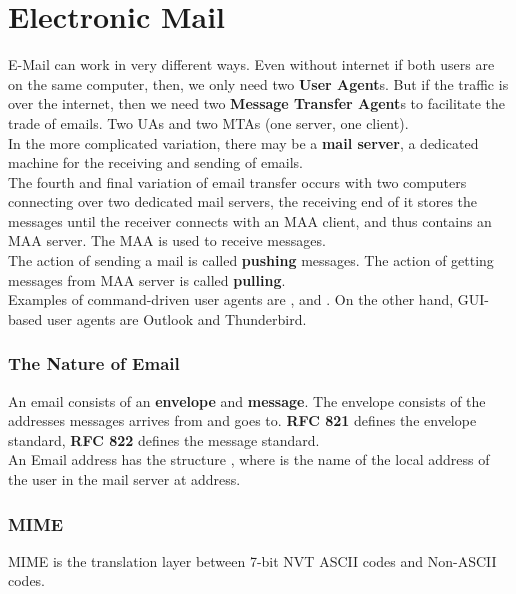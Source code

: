 \documentclass[11pt,a4paper,twoside]{book}
\begin{document}
\section{Electronic Mail}

E-Mail can work in  very different ways. Even without internet if both users are on the same computer, then, we only need two \textbf{User Agent}s. But if the traffic is over the internet, then we need two \textbf{Message Transfer Agent}s to facilitate  the trade of emails. Two UAs and two MTAs (one server, one client).\\

In the more complicated variation, there may be a \textbf{mail server}, a dedicated machine for the receiving and sending of emails.\\

The fourth and final variation of email transfer occurs with two computers connecting over two dedicated mail servers, the receiving end of it stores the messages until the receiver connects with an MAA client, and thus contains an MAA server. The MAA is used to receive messages.\\

The action of sending a mail is called \textbf{pushing} messages. The action of getting messages from MAA server is called \textbf{pulling}.\\

Examples of command-driven user agents are ,  and . On the other hand, GUI-based user agents are Outlook and Thunderbird.

\subsubsection{The Nature of Email}

An email consists of an \textbf{envelope} and \textbf{message}. The envelope consists of the addresses messages arrives from and goes to. \textbf{RFC 821} defines the envelope standard, \textbf{RFC 822} defines the message standard.\\

An Email address has the structure , where  is the name of the local address of the user in the mail server at  address.

\subsubsection{MIME}

MIME is the translation layer between 7-bit NVT ASCII codes and Non-ASCII codes.\\
\end{document}
